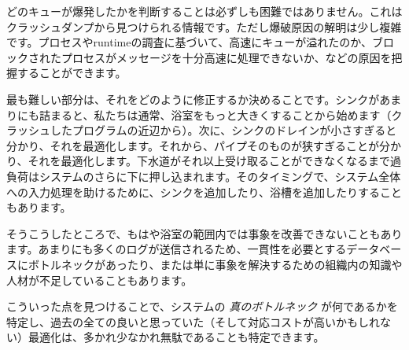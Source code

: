 どのキューが爆発したかを判断することは必ずしも困難ではありません。これはクラッシュダンプから見つけられる情報です。ただし爆破原因の解明は少し複雑です。プロセスやruntimeの調査に基づいて、高速にキューが溢れたのか、ブロックされたプロセスがメッセージを十分高速に処理できないか、などの原因を把握することができます。

最も難しい部分は、それをどのように修正するか決めることです。シンクがあまりにも詰まると、私たちは通常、浴室をもっと大きくすることから始めます（クラッシュしたプログラムの近辺から）。次に、シンクのドレインが小さすぎると分かり、それを最適化します。それから、パイプそのものが狭すぎることが分かり、それを最適化します。下水道がそれ以上受け取ることができなくなるまで過負荷はシステムのさらに下に押し込まれます。そのタイミングで、システム全体への入力処理を助けるために、シンクを追加したり、浴槽を追加したりすることもあります。

そうこうしたところで、もはや浴室の範囲内では事象を改善できないこともあります。あまりにも多くのログが送信されるため、一貫性を必要とするデータベースにボトルネックがあったり、または単に事象を解決するための組織内の知識や人材が不足していることもあります。

こういった点を見つけることで、システムの \emph{真のボトルネック} が何であるかを特定し、過去の全ての良いと思っていた（そして対応コストが高いかもしれない）最適化は、多かれ少なかれ無駄であることも特定できます。

